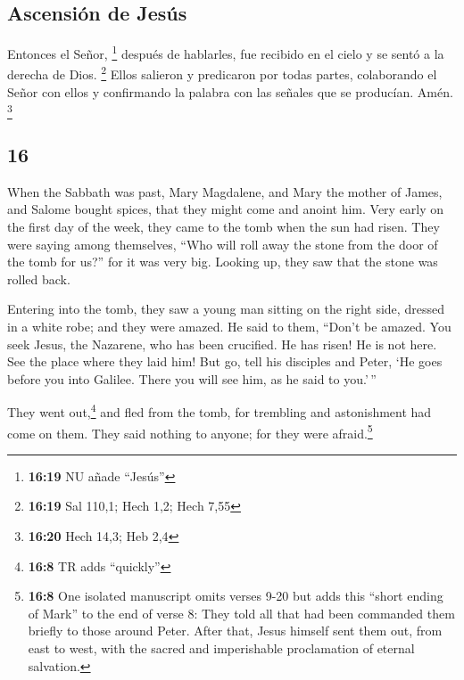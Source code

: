 \begin{paracol}{2}
\hypertarget{ascensiuxf3n-de-jesuxfas}{%
\subsection{Ascensión de Jesús}\label{ascensiuxf3n-de-jesuxfas}}

 Entonces el Señor, \footnote{\textbf{16:19} NU añade
  ``Jesús''} después de hablarles, fue recibido en el cielo y se sentó a
la derecha de Dios. \footnote{\textbf{16:19} Sal 110,1; Hech 1,2; Hech
  7,55}  Ellos salieron y predicaron por todas partes,
colaborando el Señor con ellos y confirmando la palabra con las señales
que se producían. Amén. \footnote{\textbf{16:20} Hech 14,3; Heb 2,4}
\switchcolumn \begin{otherlanguage}{english}

\hypertarget{section-30}{%
\section{16}\label{section-30}}

 When the Sabbath was past, Mary Magdalene, and Mary the
mother of James, and Salome bought spices, that they might come and
anoint him.  Very early on the first day of the week, they
came to the tomb when the sun had risen.  They were saying
among themselves, ``Who will roll away the stone from the door of the
tomb for us?''  for it was very big. Looking up, they saw
that the stone was rolled back.

 Entering into the tomb, they saw a young man sitting on
the right side, dressed in a white robe; and they were amazed.
 He said to them, ``Don't be amazed. You seek Jesus, the
Nazarene, who has been crucified. He has risen! He is not here. See the
place where they laid him!  But go, tell his disciples and
Peter, `He goes before you into Galilee. There you will see him, as he
said to you.'\,''

 They went out,\footnote{\textbf{16:8} TR adds ``quickly''}
and fled from the tomb, for trembling and astonishment had come on them.
They said nothing to anyone; for they were afraid.\footnote{\textbf{16:8}
  One isolated manuscript omits verses 9-20 but adds this ``short ending
  of Mark'' to the end of verse 8: They told all that had been commanded
  them briefly to those around Peter. After that, Jesus himself sent
  them out, from east to west, with the sacred and imperishable
  proclamation of eternal salvation.}


\end{otherlanguage}
\end{paracol}
